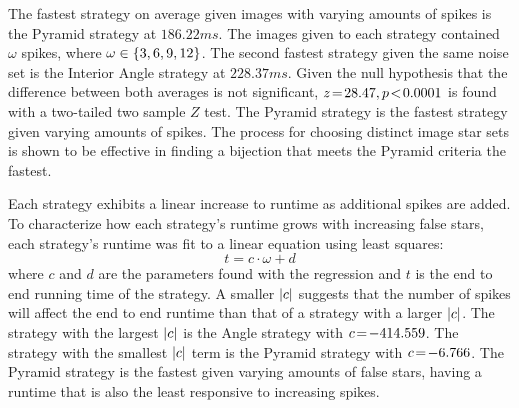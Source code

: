 %
%
%
%
The fastest strategy on average given images with varying amounts of spikes is the Pyramid strategy at $186.22\si{ms}$.
The images given to each strategy contained $\omega$ spikes, where $\omega \in \left\{  3, 6, 9, 12  \right\}$.
The second fastest strategy given the same noise set is the Interior Angle strategy at $228.37\si{ms}$.
Given the null hypothesis that the difference between both averages is not significant, $z \!=\! 28.47, p\!<\!0.0001$ is
found with a two-tailed two sample $Z$ test.
The Pyramid strategy is the fastest strategy given varying amounts of spikes.
The process for choosing distinct image star sets is shown to be effective in finding a bijection that meets the Pyramid
criteria the fastest.

%
%
%
Each strategy exhibits a linear increase to runtime as additional spikes are added.
To characterize how each strategy's runtime grows with increasing false stars, each strategy's runtime was fit
to a linear equation using least squares:
\begin{equation}
    t = c\cdot\omega + d
\end{equation}
where $c$ and $d$ are the parameters found with the regression and $t$ is the end to end running time of the strategy.
A smaller $\left| c \right|$ suggests that the number of spikes will affect the end to end runtime than that of a strategy with a
larger $\left| c \right|$.
The strategy with the largest $\left| c \right|$ is the Angle strategy with $c \!=\! -414.559$.
The strategy with the smallest $\left| c \right|$ term is the Pyramid strategy with $c \!=\! -6.766$.
The Pyramid strategy is the fastest given varying amounts of false stars, having a runtime that is also the least
responsive to increasing spikes.

